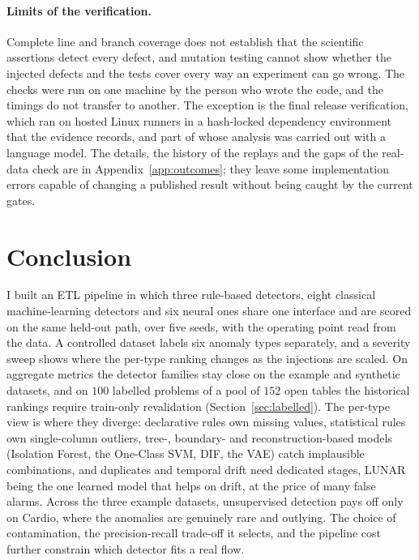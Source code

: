 \documentclass[conference]{IEEEtran}
\begin{document}
\paragraph{Limits of the verification.}
Complete line and branch coverage does not establish that the scientific assertions detect
every defect, and mutation testing cannot show whether the injected defects and the tests cover
every way an experiment can go wrong. The checks were run on one machine by the person who wrote the
code, and the timings do not transfer to another. The exception is the final release verification, which ran on hosted Linux runners in a hash-locked dependency environment that the evidence records, and part of whose analysis was carried out with a language model. The details, the history of the replays and the
gaps of the real-data check are in Appendix~\ref{app:outcomes}; they leave some implementation
errors capable of changing a published result without being caught by the current gates.

\section{Conclusion}
\label{sec:conclusion}

I built an ETL pipeline in which three rule-based detectors, eight classical
machine-learning detectors and six neural ones share one interface and are scored on
the same held-out path, over five seeds, with the operating point read
from the data. A controlled dataset labels six anomaly types separately,
and a severity sweep shows where the per-type ranking changes as the
injections are scaled. On aggregate metrics the detector families stay
close on the example and synthetic datasets, and on $100$ labelled problems of a pool of
$152$ open tables the historical rankings require train-only revalidation
(Section~\ref{sec:labelled}). The per-type view is where they diverge:
declarative rules own missing values, statistical rules own single-column
outliers, tree-, boundary- and reconstruction-based models (Isolation Forest, the
One-Class SVM, DIF, the VAE) catch implausible combinations, and duplicates and temporal drift need
dedicated stages, LUNAR being the one learned model that helps on drift, at the price
of many false alarms. Across the three example datasets, unsupervised detection
pays off only on Cardio, where the anomalies are genuinely rare and
outlying. The choice of contamination, the precision-recall trade-off it
selects, and the pipeline cost further constrain which detector fits a
real flow.
\end{document}
